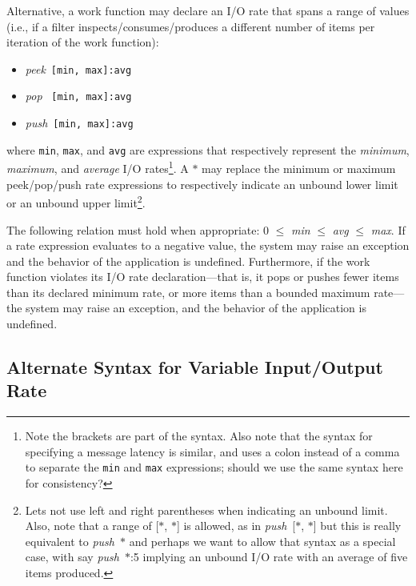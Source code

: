 \documentclass{tr}
\begin{document}
Alternative,  a work function  may declare  an I/O  rate that  spans a
range  of  values  (i.e.,  if a  filter  inspects/consumes/produces  a
different number of items per iteration of the work function):
\begin{itemize}
\item {\it peek}~\texttt{[min, max]:avg}
\item {\it pop }~\texttt{[min, max]:avg}
\item {\it push}~\texttt{[min, max]:avg}
\end{itemize}
where  \texttt{min}, \texttt{max},  and  \texttt{avg} are  expressions
that respectively represent the {\it minimum}, {\it maximum}, and {\it
average}  I/O  rates\footnote{Note  the   brackets  are  part  of  the
syntax. Also note that the  syntax for specifying a message latency is
similar,  and  uses  a  colon  instead  of a  comma  to  separate  the
\texttt{min}  and \texttt{max}  expressions;  should we  use the  same
syntax  here for  consistency?}.  A  $*$  may replace  the minimum  or
maximum  peek/pop/push rate  expressions to  respectively  indicate an
unbound lower  limit or an  unbound upper limit\footnote{Lets  not use
left and  right parentheses when  indicating an unbound  limit.  Also,
note that  a range of  [$*$, $*$] is  allowed, as in  {\it push}~[$*$,
$*$] but  this is really equivalent  to {\it push}~$*$  and perhaps we
want to allow that syntax as a special case, with say {\it push}~$*$:5
implying an unbound I/O rate with an average of five items produced.}.

The following relation  must hold when appropriate: 0  $\le$ {\it min}
$\le$ {\it avg}  $\le$ {\it max}. If a rate  expression evaluates to a
negative value, the system may  raise an exception and the behavior of
the  application  is undefined.   Furthermore,  if  the work  function
violates its I/O  rate declaration---that is, it pops  or pushes fewer
items than  its declared  minimum rate, or  more items than  a bounded
maximum rate---the system may raise  an exception, and the behavior of
the application is undefined.


\subsection{Alternate Syntax for Variable Input/Output Rate}
\end{document}
